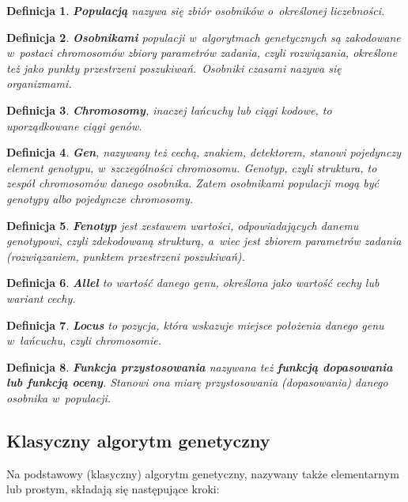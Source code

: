 \documentclass[twoside,12pt]{report}
\newtheorem{definition}{Definicja} %
\begin{document}
\begin{definition}
\textbf{Populacją} nazywa się zbiór osobników o~określonej liczebności.
\end{definition}

\begin{definition}
\textbf{Osobnikami} populacji w~algorytmach genetycznych są zakodowane w~postaci chromosomów zbiory parametrów zadania, czyli rozwiązania, określone też jako punkty przestrzeni poszukiwań.~Osobniki czasami nazywa się organizmami.
\end{definition}

\begin{definition}
\textbf{Chromosomy}, inaczej łańcuchy lub ciągi kodowe, to uporządkowane ciągi genów.
\end{definition}

\begin{definition}
\textbf{Gen}, nazywany też cechą, znakiem, detektorem, stanowi pojedynczy element genotypu, w~szczególności chromosomu. Genotyp, czyli struktura, to zespół chromosomów danego osobnika. Zatem osobnikami populacji mogą być genotypy albo pojedyncze chromosomy.
\end{definition}

\begin{definition}
\textbf{Fenotyp} jest zestawem wartości, odpowiadających danemu genotypowi, czyli zdekodowaną strukturą, a~wiec jest zbiorem parametrów zadania (rozwiązaniem, punktem przestrzeni poszukiwań).
\end{definition}

\begin{definition}
\textbf{Allel} to wartość danego genu, określona jako wartość cechy lub wariant cechy.
\end{definition}

\begin{definition}
\textbf{Locus} to pozycja, która wskazuje miejsce położenia danego genu w~łańcuchu, czyli chromosomie.
\end{definition}

\begin{definition}
\textbf{Funkcja przystosowania} nazywana też \textbf{funkcją dopasowania lub funkcją oceny}. Stanowi ona miarę przystosowania (dopasowania) danego osobnika w~populacji.
\end{definition}

\subsection{Klasyczny algorytm genetyczny}\label{section.klasycnzy_genenetyczny} 
Na podstawowy (klasyczny) algorytm genetyczny, nazywany także elementarnym lub prostym, składają się następujące kroki:
\end{document}
